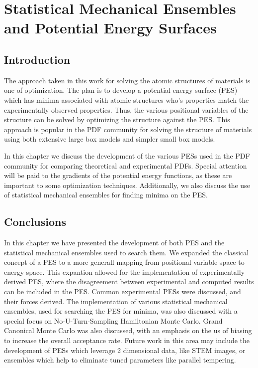 \chapter{Statistical Mechanical Ensembles and Potential Energy Surfaces} \label{ch:pes_e}
\section{Introduction}
The approach taken in this work for solving the atomic structures of materials is one of optimization.
The plan is to develop a potential energy surface (PES) which has minima associated with atomic structures who's properties match the experimentally observed properties.
Thus, the various positional variables of the structure can be solved by optimizing the structure against the PES.
This approach is popular in the PDF community for solving the structure of materials using both extensive large box models and simpler small box models.

In this chapter we discuss the development of the various PESs used in the PDF community for comparing theoretical and experimental PDFs.
Special attention will be paid to the gradients of the potential energy functions, as these are important to some optimization techniques.
Additionally, we also discuss the use of statistical mechanical ensembles for finding minima on the PES.





\section{Conclusions}
In this chapter we have presented the development of both PES and the statistical mechanical ensembles used to search them.
We expanded the classical concept of a PES to a more generall mapping from positional variable space to energy space.
This expantion allowed for the implementation of experimentally derived PES, where the disagreement between experimental and computed results can be included in the PES.
Common experimental PESs were discussed, and their forces derived.
The implementation of various statistical mechanical ensembles, used for searching the PES for minima, was also discussed with a special focus on No-U-Turn-Sampling Hamiltonian Monte Carlo.
Grand Canonical Monte Carlo was also discussed, with an emphasis on the us of biasing to increase the overall acceptance rate.
Future work in this area may include the development of PESs which leverage 2 dimensional data, like STEM images, or ensembles which help to eliminate tuned parameters like parallel tempering.

